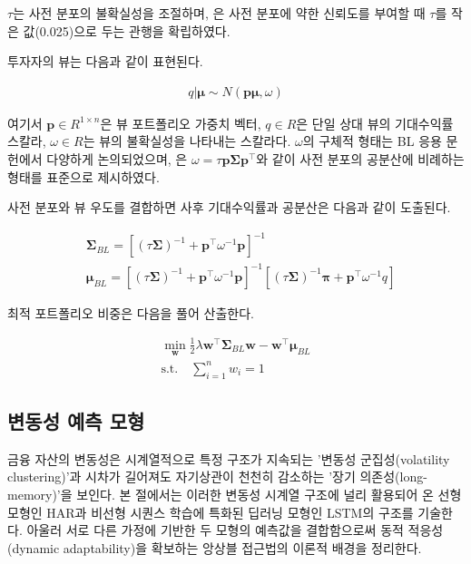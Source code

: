 \documentclass{article}
\begin{document}
$\tau$는 사전 분포의 불확실성을 조절하며, \citet{helitterman1999}은 사전 분포에 약한 신뢰도를 부여할 때 $\tau$를 작은 값(0.025)으로 두는 관행을 확립하였다.

투자자의 뷰는 다음과 같이 표현된다.

\begin{align}\label{eq:bl_q}
    q|\boldsymbol{\mu} \sim N(\mathbf{p}\boldsymbol{\mu}, \omega)
\end{align}

여기서 $\mathbf{p} \in R^{1 \times n}$은 뷰 포트폴리오 가중치 벡터, $q \in R$은 단일 상대 뷰의 기대수익률 스칼라, $\omega\in R$는 뷰의 불확실성을 나타내는 스칼라다. $\omega$의 구체적 형태는 BL 응용 문헌에서 다양하게 논의되었으며, \citet{helitterman1999}은 $\omega = \tau\mathbf{p}\boldsymbol{\Sigma}\mathbf{p}^\top$와 같이 사전 분포의 공분산에 비례하는 형태를 표준으로 제시하였다.

사전 분포와 뷰 우도를 결합하면 사후 기대수익률과 공분산은 다음과 같이 도출된다.

\begin{align}\label{eq:bl_sigma_pos}
    & \boldsymbol{\Sigma}_{BL} = [(\tau\boldsymbol{\Sigma})^{-1} + \mathbf{p}^\top\omega^{-1}\mathbf{p}]^{-1}\\
    \label{eq:bl_mu_pos}
    & \boldsymbol{\mu}_{BL} = [(\tau\boldsymbol{\Sigma})^{-1} + \mathbf{p}^\top\omega^{-1}\mathbf{p}]^{-1}[(\tau\boldsymbol{\Sigma})^{-1}\boldsymbol{\pi}+\mathbf{p}^\top\omega^{-1}q]
\end{align}

최적 포트폴리오 비중은 다음을 풀어 산출한다.

\begin{align}\label{eq:bl_w}
    \min_{\mathbf{w}}\frac{1}{2}\lambda\mathbf{w}^\top\boldsymbol{\Sigma}_{BL}\mathbf{w}-\mathbf{w}^\top\boldsymbol{\mu}_{BL} \\
\text{s.t.} \quad \sum_{i=1}^{n}{w_i} = 1
\end{align}

\subsection{변동성 예측 모형}
\label{subsec:vol_pred_review}

금융 자산의 변동성은 시계열적으로 특정 구조가 지속되는 '변동성 군집성(volatility clustering)'과 시차가 길어져도 자기상관이 천천히 감소하는 '장기 의존성(long-memory)'을 보인다\citep{cont2001}. 본 절에서는 이러한 변동성 시계열 구조에 널리 활용되어 온 선형 모형인 HAR\citep{muller1997}과 비선형 시퀀스 학습에 특화된 딥러닝 모형인 LSTM\citep{hochreiter1997}의 구조를 기술한다. 아울러 서로 다른 가정에 기반한 두 모형의 예측값을 결합함으로써 동적 적응성(dynamic adaptability)을 확보하는 앙상블 접근법의 이론적 배경을 정리한다.
\end{document}
